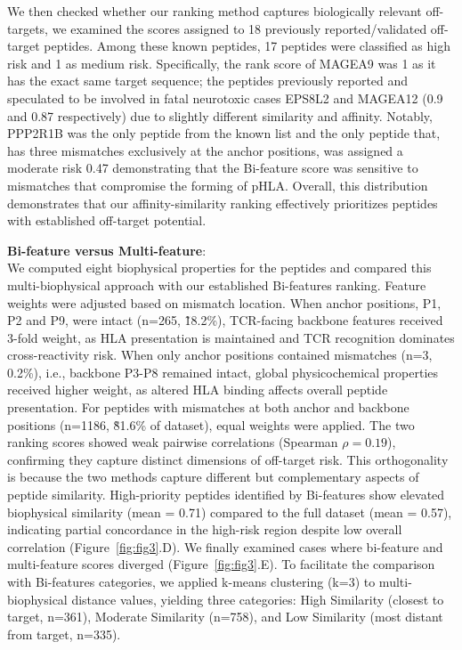 \documentclass[unnumsec,webpdf,contemporary,large]{oup-authoring-template}%
\theoremstyle{thmstyleone}%
\theoremstyle{thmstyletwo}%
\theoremstyle{thmstylethree}%
\begin{document}
        We then checked whether our ranking method captures biologically relevant off-targets, we examined the scores assigned to 18 previously reported/validated off-target peptides. Among these known peptides, 17 peptides were classified as high risk and 1 as medium risk. Specifically, the rank score of MAGEA9 was 1 as it has the exact same target sequence; the peptides previously reported and speculated to be involved in fatal neurotoxic cases EPS8L2 and MAGEA12 (0.9 and 0.87 respectively) due to slightly different similarity and affinity. Notably, PPP2R1B was the only peptide from the known list and the only peptide that, has three mismatches exclusively at the anchor positions, was assigned a moderate risk 0.47 demonstrating that the Bi-feature score was sensitive to mismatches that compromise the forming of pHLA. 
        Overall, this distribution demonstrates that our affinity-similarity ranking effectively prioritizes peptides with established off-target potential.

        \textbf{Bi-feature versus Multi-feature}:\\
        We computed eight biophysical properties for the peptides and compared this multi-biophysical approach with our established Bi-features ranking. Feature weights were adjusted based on mismatch location. When anchor positions, P1, P2 and P9, were intact (n=265, \~18.2\%), TCR-facing backbone features received 3-fold weight, as HLA presentation is maintained and TCR recognition dominates cross-reactivity risk. When only anchor positions contained mismatches (n=3, 0.2\%), i.e., backbone P3-P8 remained intact, global physicochemical properties received higher weight, as altered HLA binding affects overall peptide presentation. For peptides with mismatches at both anchor and backbone positions (n=1186, \~81.6\% of dataset), equal weights were applied. 
        The two ranking scores showed weak pairwise correlations (Spearman $\rho = 0.19$), confirming they capture distinct dimensions of off-target risk. This orthogonality is because the two methods capture different but complementary aspects of peptide similarity. High-priority peptides identified by Bi-features show elevated biophysical similarity (mean = 0.71) compared to the full dataset (mean = 0.57), indicating partial concordance in the high-risk region despite low overall correlation (Figure~\ref{fig:fig3}.D). 
        We finally examined cases where bi-feature and multi-feature scores diverged (Figure~\ref{fig:fig3}.E). To facilitate the comparison with Bi-features categories, we applied k-means clustering (k=3) to multi-biophysical distance values, yielding three categories: High Similarity (closest to target, n=361), Moderate Similarity (n=758), and Low Similarity (most distant from target, n=335).
\end{document}
